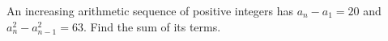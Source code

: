 An increasing arithmetic sequence of positive integers has $a_n-a_1=20$ and $a_n^2-a_{n-1}^2=63$. Find the sum of its terms.
